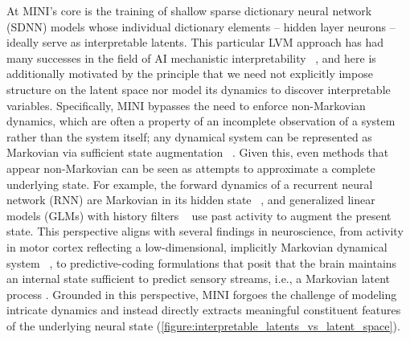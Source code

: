 At MINI's core is the training of shallow sparse dictionary neural network (SDNN) models whose individual dictionary elements -- hidden layer neurons -- ideally serve as interpretable latents. This particular LVM approach has had many successes in the field of AI mechanistic interpretability ~\cite{cunningham_2023_saes, bricken_2023_towards_monosemanticity, templeton_2024_scaling_monosemanticity, ameisen_2025_circuit_tracing, lindsey_2025_biology_llm}, and here is additionally motivated by the principle that we need not explicitly impose structure on the latent space nor model its dynamics to discover interpretable variables. Specifically, MINI bypasses the need to enforce non-Markovian dynamics, which are often a property of an incomplete observation of a system rather than the system itself; any dynamical system can be represented as Markovian via sufficient state augmentation ~\cite{takens_1981_embedding}. Given this, even methods that appear non-Markovian can be seen as attempts to approximate a complete underlying state. For example, the forward dynamics of a recurrent neural network (RNN) are Markovian in its hidden state ~\cite{sussillo_2013_rnn_dynamics, goodfellow_2016_rnn}, and generalized linear models (GLMs) with history filters ~\cite{pillow_2008_glms, truccolo_2005_pointprocess} use past activity to augment the present state. This perspective aligns with several findings in neuroscience, from activity in motor cortex reflecting a low-dimensional, implicitly Markovian dynamical system ~\cite{churchland_2012_population_dynamics, shenoy_2013_dynamical_perspective}, to predictive-coding formulations that posit that the brain maintains an internal state sufficient to predict sensory streams, i.e., a Markovian latent process \cite{rao_1999_predictive_coding, doya_2007_bayesian_brain, friston_2010_free_energy}. Grounded in this perspective, MINI forgoes the challenge of modeling intricate dynamics and instead directly extracts meaningful constituent features of the underlying neural state (\autoref{figure:interpretable_latents_vs_latent_space}).

